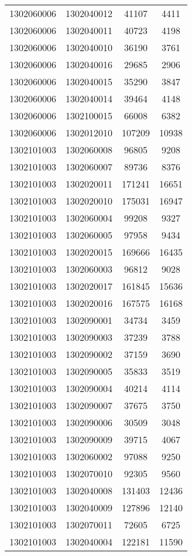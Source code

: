 \begin{longtable}{llcc}
1302060006 & 1302040012 & 41107 & 4411\\
1302060006 & 1302040011 & 40723 & 4198\\
1302060006 & 1302040010 & 36190 & 3761\\
1302060006 & 1302040016 & 29685 & 2906\\
1302060006 & 1302040015 & 35290 & 3847\\
1302060006 & 1302040014 & 39464 & 4148\\
1302060006 & 1302100015 & 66008 & 6382\\
1302060006 & 1302012010 & 107209 & 10938\\
1302101003 & 1302060008 & 96805 & 9208\\
1302101003 & 1302060007 & 89736 & 8376\\
1302101003 & 1302020011 & 171241 & 16651\\
1302101003 & 1302020010 & 175031 & 16947\\
1302101003 & 1302060004 & 99208 & 9327\\
1302101003 & 1302060005 & 97958 & 9434\\
1302101003 & 1302020015 & 169666 & 16435\\
1302101003 & 1302060003 & 96812 & 9028\\
1302101003 & 1302020017 & 161845 & 15636\\
1302101003 & 1302020016 & 167575 & 16168\\
1302101003 & 1302090001 & 34734 & 3459\\
1302101003 & 1302090003 & 37239 & 3788\\
1302101003 & 1302090002 & 37159 & 3690\\
1302101003 & 1302090005 & 35833 & 3519\\
1302101003 & 1302090004 & 40214 & 4114\\
1302101003 & 1302090007 & 37675 & 3750\\
1302101003 & 1302090006 & 30509 & 3048\\
1302101003 & 1302090009 & 39715 & 4067\\
1302101003 & 1302060002 & 97088 & 9250\\
1302101003 & 1302070010 & 92305 & 9560\\
1302101003 & 1302040008 & 131403 & 12436\\
1302101003 & 1302040009 & 127896 & 12140\\
1302101003 & 1302070011 & 72605 & 6725\\
1302101003 & 1302040004 & 122181 & 11590\\

\end{longtable}
